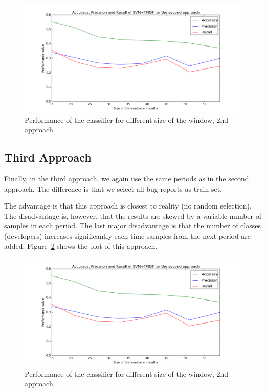 \begin{figure}[htbp]
    \centering
        \includegraphics[width=\textwidth]{./images/window_size/firefox_2a.png}
    \caption{Performance of the classifier for different size of the window, 2nd approach}
    \label{fig:window.firefox.2a}
\end{figure}

\subsection{Third Approach}

Finally, in the third approach, we again use the same periods as in the second approach. The difference is that we select all bug reports as train set.

The advantage is that this approach is closest to reality (no random selection). The disadvantage is, however, that the results are skewed by a variable number of samples in each period. The last major disadvantage is that the number of classes (developers) increases significantly each time samples from the next period are added. Figure~\ref{fig:window.firefox.3a} shows the plot of this approach.

\begin{figure}[htbp]
    \centering
        \includegraphics[width=\textwidth]{./images/window_size/firefox_2a.png}
    \caption{Performance of the classifier for different size of the window, 2nd approach}
    \label{fig:window.firefox.3a}
\end{figure}

